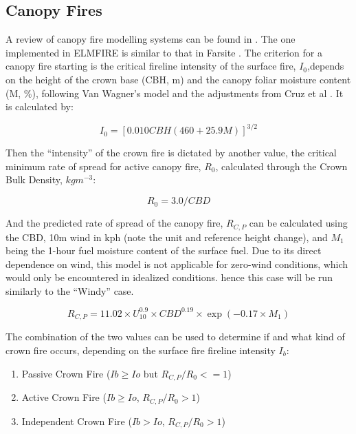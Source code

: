 \subsection{Canopy Fires}
\label{math:canopy}
A review of canopy fire modelling systems can be found in \cite{scottComparisonCrownFire2006}. The one implemented in ELMFIRE is similar to that in Farsite \cite{finneyFARSITEFireArea1994, finneyFARSITEFireArea1998}. The criterion for a canopy fire starting is the critical fireline intensity of the surface fire, $I_0$,depends on the height of the crown base (CBH, m) and the canopy foliar moisture content (M, \%), following Van Wagner's model \cite{wagnerConditionsStartSpread1977} and the adjustments from Cruz et al \cite{cruzDevelopmentTestingModels2005}. It is calculated by:

\begin{equation*}
    I_0 = \left[0.010 CBH (460+25.9M)\right]^{3/2}
\end{equation*}

Then the ``intensity'' of the crown fire is dictated by another value, the critical minimum rate of spread for active canopy fire, $R_0$, calculated through the Crown Bulk Density, $kg m^{-3}$:

\begin{equation*}
    R_0 = 3.0/CBD
\end{equation*}

And the predicted rate of spread of the canopy fire, $R_{C,P}$ can be calculated using the CBD, 10m wind in kph (note the unit and reference height change), and $M_1$ being the 1-hour fuel moisture content of the surface fuel. Due to its direct dependence on wind, this model is not applicable for zero-wind conditions, which would only be encountered in idealized conditions. hence this case will be run similarly to the ``Windy'' case. 

\begin{equation*}
    R_{C,P} = 11.02\times U_{10}^{0.9}\times CBD^{0.19}\times \exp(-0.17\times M_1)
\end{equation*}

The combination of the two values can be used to determine if and what kind of crown fire occurs, depending on the surface fire fireline intensity $I_b$:

\begin{enumerate}
    \item Passive Crown Fire ($Ib \geq Io$ but $R_{C,P}/R_0<=1$)
    \item Active Crown Fire ($Ib \geq Io$, $R_{C,P}/R_0>1$)
    \item Independent Crown Fire ($Ib>Io$, $R_{C,P}/R_0>1$)
\end{enumerate}

